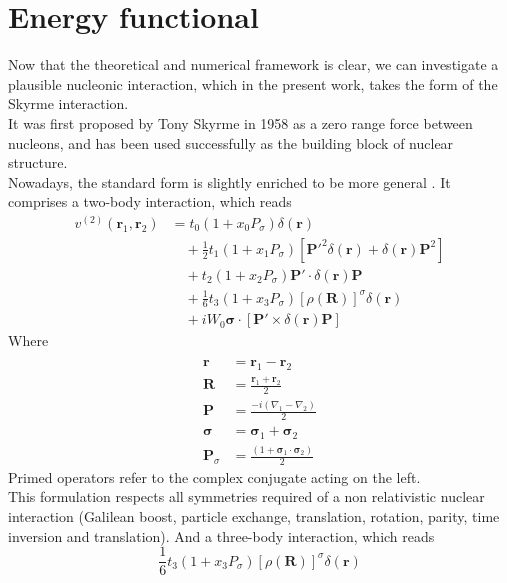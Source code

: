 \chapter{Energy functional}
Now that the theoretical and numerical framework is clear, we can investigate a plausible nucleonic interaction, which in the present work, takes the form of the Skyrme interaction.
\\It was first proposed by Tony Skyrme in 1958 \cite{SKYRME1958615} as a zero range force between nucleons, and has been used successfully as the building block of nuclear structure.
\\Nowadays, the standard form is slightly enriched to be more general \cite{CHABANAT1997710}. It comprises a two-body interaction, which reads
\begin{align}
v^{(2)}(\mathbf{r}_1, \mathbf{r}_2) &= t_0 \left(1 + x_0 P_\sigma \right) \delta(\mathbf{r}) \\
&\quad + \frac{1}{2} t_1 \left(1 + x_1 P_\sigma \right) \left[ \mathbf{P}'^2 \delta(\mathbf{r}) + \delta(\mathbf{r}) \mathbf{P}^2 \right] \\
&\quad + t_2 \left(1 + x_2 P_\sigma \right) \mathbf{P}' \cdot \delta(\mathbf{r}) \mathbf{P} \\
&\quad + \frac{1}{6} t_3 \left(1 + x_3 P_\sigma \right) \left[ \rho(\mathbf{R}) \right]^\sigma \delta(\mathbf{r}) \\
&\quad + i W_0 \boldsymbol{\sigma}\cdot \left[ \mathbf{P}' \times \delta(\mathbf{r}) \mathbf{P} \right]
\end{align}
Where 
\begin{align*}
\\\mathbf{r} &= \mathbf{r}_1 - \mathbf{r}_2
\\\mathbf{R} &= \frac{\mathbf{r}_1+\mathbf{r}_2}{2}
\\\mathbf{P} &= \frac{-i(\nabla_1 - \nabla_2)}{2}
\\\boldsymbol{\sigma} &= \boldsymbol{\sigma}_1 + \boldsymbol{\sigma}_2
\\\mathbf{P}_\sigma &= \frac{(1+\boldsymbol{\sigma}_1\cdot\boldsymbol{\sigma}_2)}{2}
\end{align*}
Primed operators refer to the complex conjugate acting on the left.
\\This formulation respects all symmetries required of a non relativistic nuclear interaction (Galilean boost, particle exchange, translation, rotation, parity, time inversion and translation).
And a three-body interaction, which reads
\begin{equation}
\frac 1 6 t_3 \left(1 + x_3 P_\sigma \right) \left[ \rho(\mathbf{R}) \right]^\sigma \delta(\mathbf{r}) 
\end{equation}



